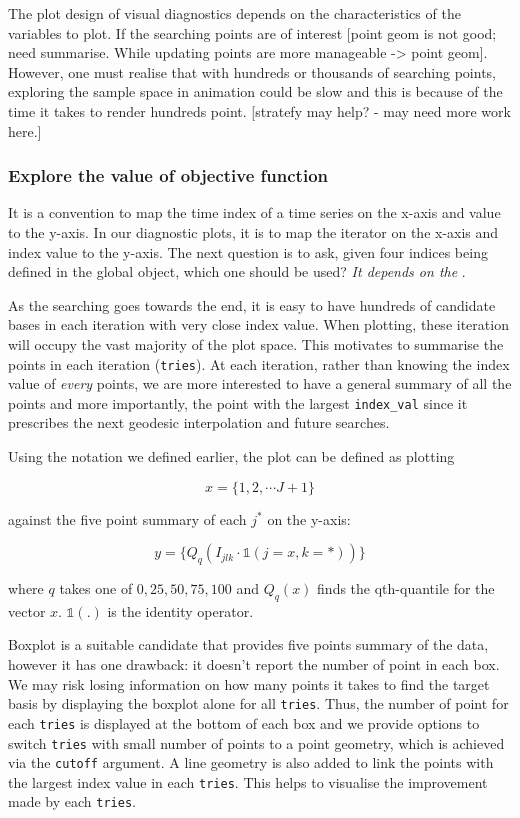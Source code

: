 \documentclass[12pt]{article}
\begin{document}
The plot design of visual diagnostics depends on the characteristics of
the variables to plot. If the searching points are of interest {[}point
geom is not good; need summarise. While updating points are more
manageable -\textgreater{} point geom{]}. However, one must realise that
with hundreds or thousands of searching points, exploring the sample
space in animation could be slow and this is because of the time it
takes to render hundreds point. {[}stratefy may help? - may need more
work here.{]}

\hypertarget{static}{%
\subsubsection{Explore the value of objective function}\label{static}}

It is a convention to map the time index of a time series on the x-axis
and value to the y-axis. In our diagnostic plots, it is to map the
iterator on the x-axis and index value to the y-axis. The next question
is to ask, given four indices being defined in the global object, which
one should be used? \emph{It depends on the }.

As the searching goes towards the end, it is easy to have hundreds of
candidate bases in each iteration with very close index value. When
plotting, these iteration will occupy the vast majority of the plot
space. This motivates to summarise the points in each iteration
(\texttt{tries}). At each iteration, rather than knowing the index value
of \emph{every} points, we are more interested to have a general summary
of all the points and more importantly, the point with the largest
\texttt{index\_val} since it prescribes the next geodesic interpolation
and future searches.

Using the notation we defined earlier, the plot can be defined as
plotting

\[x = \{1, 2, \cdots J + 1\}\]

against the five point summary of each \(j^*\) on the y-axis:

\[y = \{Q_q(I_{jlk} \cdot \mathds{1} (j = x, k = \ast))\}\]

where \(q\) takes one of \(0, 25, 50, 75, 100\) and \(Q_q(x)\) finds the
qth-quantile for the vector \(x\). \(\mathds{1}(.)\) is the identity
operator.

Boxplot is a suitable candidate that provides five points summary of the
data, however it has one drawback: it doesn't report the number of point
in each box. We may risk losing information on how many points it takes
to find the target basis by displaying the boxplot alone for all
\texttt{tries}. Thus, the number of point for each \texttt{tries} is
displayed at the bottom of each box and we provide options to switch
\texttt{tries} with small number of points to a point geometry, which is
achieved via the \texttt{cutoff} argument. A line geometry is also added
to link the points with the largest index value in each \texttt{tries}.
This helps to visualise the improvement made by each \texttt{tries}.
\end{document}
